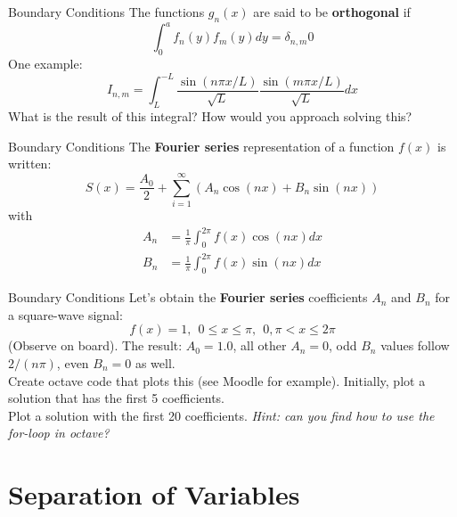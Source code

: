 \documentclass{beamer}
\begin{document}
\begin{frame}{Boundary Conditions}
The functions $g_n(x)$ are said to be \textbf{\alert{orthogonal}} if
\begin{equation}
\int_0^a f_n(y) f_m(y) dy = \delta_{n,m}0
\end{equation}
One example:
\begin{equation}
I_{n,m} = \int_L^{-L} \frac{\sin(n\pi x/L)}{\sqrt{L}}\frac{\sin(m\pi x/L)}{\sqrt{L}} dx
\end{equation}
What is the result of this integral?  How would you approach solving this?
\end{frame}

\begin{frame}{Boundary Conditions}
The \alert{\textbf{Fourier series}} representation of a function $f(x)$ is written:
\begin{equation}
S(x) = \frac{A_0}{2}+\sum_{i=1}^{\infty} \left( A_n \cos(nx) + B_n \sin(nx) \right)
\end{equation}
with
\begin{align}
A_n &= \frac{1}{\pi} \int_0^{2\pi} f(x) \cos(nx) dx \\
B_n &= \frac{1}{\pi} \int_0^{2\pi} f(x) \sin(nx) dx
\end{align}
\end{frame}

\begin{frame}{Boundary Conditions}
Let's obtain the \alert{\textbf{Fourier series}} coefficients $A_n$ and $B_n$ for a square-wave signal:
\begin{equation}
f(x) = 1, ~~ 0 \leq x \leq \pi, ~~ 0,  \pi < x \leq 2\pi 
\end{equation}
(Observe on board).  The result: $A_0 = 1.0$, all other $A_n = 0$, odd $B_n$ values follow $2/(n\pi)$, even $B_n = 0$ as well. \\ \vspace{0.5cm}
Create octave code that plots this (see Moodle for example).  Initially, plot a solution that has the first 5 coefficients. \\ \vspace{0.5cm}
\alert{Plot a solution with the first 20 coefficients.}  \textit{Hint: can you find how to use the for-loop in octave?}
\end{frame}

\section{Separation of Variables}
\end{document}
